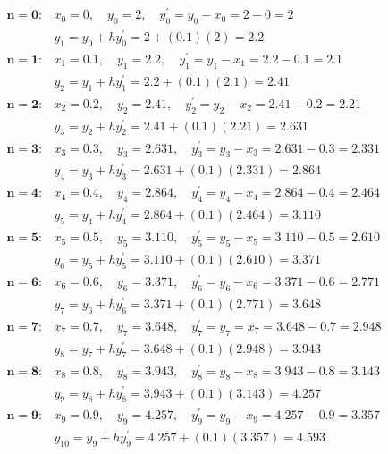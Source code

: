 \documentclass[10pt]{article}
\begin{document}
$$
\begin{array}{ll}
\mathbf{n = 0}: & x_{0}=0, \quad y_{0}=2, \quad y_{0}^{\prime}=y_{0}-x_{0}=2-0=2 \\
& y_{1}=y_{0}+h y_{0}^{\prime}=2+(0.1)(2)=2.2 \\
\mathbf{n = 1}: & x_{1}=0.1, \quad y_{1}=2.2, \quad y_{1}^{\prime}=y_{1}-x_{1}=2.2-0.1=2.1 \\
& y_{2}=y_{1}+h y_{1}^{\prime}=2.2+(0.1)(2.1)=2.41 \\
\mathbf{n = \mathbf { 2 }}: & x_{2}=0.2, \quad y_{2}=2.41, \quad y_{2}^{\prime}=y_{2}-x_{2}=2.41-0.2=2.21 \\
& y_{3}=y_{2}+h y_{2}^{\prime}=2.41+(0.1)(2.21)=2.631 \\
\mathbf{n = 3}: & x_{3}=0.3, \quad y_{3}=2.631, \quad y_{3}^{\prime}=y_{3}-x_{3}=2.631-0.3=2.331 \\
& y_{4}=y_{3}+h y_{3}^{\prime}=2.631+(0.1)(2.331)=2.864 \\
\mathbf{n = 4 :} & x_{4}=0.4, \quad y_{4}=2.864, \quad y_{4}^{\prime}=y_{4}-x_{4}=2.864-0.4=2.464 \\
& y_{5}=y_{4}+h y_{4}^{\prime}=2.864+(0.1)(2.464)=3.110 \\
\mathbf{n = 5 :} & x_{5}=0.5, \quad y_{5}=3.110, \quad y_{5}^{\prime}=y_{5}-x_{5}=3.110-0.5=2.610 \\
& y_{6}=y_{5}+h y_{5}^{\prime}=3.110+(0.1)(2.610)=3.371 \\
\mathbf{n = 6}: & x_{6}=0.6, \quad y_{6}=3.371, \quad y_{6}^{\prime}=y_{6}-x_{6}=3.371-0.6=2.771 \\
& y_{7}=y_{6}+h y_{6}^{\prime}=3.371+(0.1)(2.771)=3.648 \\
\mathbf{n = 7 :} & x_{7}=0.7, \quad y_{7}=3.648, \quad y_{7}^{\prime}=y_{7}=x_{7}=3.648-0.7=2.948 \\
& y_{8}=y_{7}+h y_{7}^{\prime}=3.648+(0.1)(2.948)=3.943 \\
\mathbf{n = 8}: & x_{8}=0.8, \quad y_{8}=3.943, \quad y_{8}^{\prime}=y_{8}-x_{8}=3.943-0.8=3.143 \\
& y_{9}=y_{8}+h y_{8}^{\prime}=3.943+(0.1)(3.143)=4.257 \\
\mathbf{n = 9 :} & x_{9}=0.9, \quad y_{9}=4.257, \quad y_{9}^{\prime}=y_{9}-x_{9}=4.257-0.9=3.357 \\
& y_{10}=y_{9}+h y_{9}^{\prime}=4.257+(0.1)(3.357)=4.593
\end{array}
$$
\end{document}
